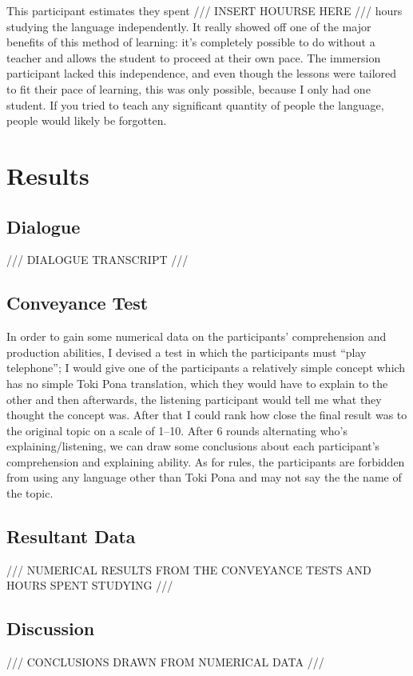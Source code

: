 \documentclass[a4paper,10pt]{article}
\begin{document}
This participant estimates they spent /// INSERT HOUURSE HERE /// hours studying the language
independently. It really showed off one of the major benefits of this method of learning: it's
completely possible to do without a teacher and allows the student to proceed at their own pace.
The immersion participant lacked this independence, and even though the lessons were tailored to fit
their pace of learning, this was only possible, because I only had one student. If you tried to teach
any significant quantity of people the language, people would likely be forgotten.


\section{Results}
\subsection{Dialogue}
/// DIALOGUE TRANSCRIPT ///

\subsection{Conveyance Test}
In order to gain some numerical data on the participants' comprehension and production abilities, I
devised a test in which the participants must ``play telephone''; I would give one of the participants
a relatively simple concept which has no simple Toki Pona translation, which they would have to explain
to the other and then afterwards, the listening participant would tell me what they thought the concept
was. After that I could rank how close the final result was to the original topic on a scale of 1--10.
After 6 rounds alternating who's explaining/listening, we can draw some conclusions about each
participant's comprehension and explaining ability. As for rules, the participants are forbidden from
using any language other than Toki Pona and may not say the the name of the topic.

\subsection{Resultant Data}
/// NUMERICAL RESULTS FROM THE CONVEYANCE TESTS AND HOURS SPENT STUDYING ///

\subsection{Discussion}
/// CONCLUSIONS DRAWN FROM NUMERICAL DATA ///
\end{document}
